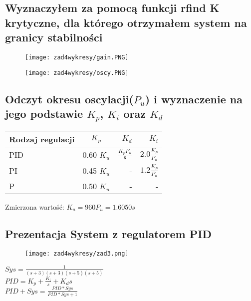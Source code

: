\subsection{Wyznaczyłem za pomocą funkcji rfind K krytyczne, dla którego otrzymałem system na granicy stabilności}

	\begin{figure}[H]
    \centering
    \texttt{[image: zad4wykresy/gain.PNG]}
    \label{lamana}
	\end{figure}

 \begin{figure}[H]
    \centering
    \texttt{[image: zad4wykresy/oscy.PNG]}
    \label{lamana}
	\end{figure}
	
\subsection{Odczyt okresu oscylacji($P_u$) i wyznaczenie na jego podstawie $K_p$, $K_i$ oraz $K_d$ }
	
 \begin{tabular}{|l|c|r|r|}
  \hline Rodzaj regulacji & $K_p$ & $K_d$ & $K_i$\\
  \hline PID & 0.60 $K_u$ & $\frac{K_pP_u}{8}$ & $2.0 \frac{K_p}{P_u}$\\
  \hline PI & 0.45 $K_u$ & - & $1.2 \frac{K_p}{P_u}$\\
  \hline P & 0.50 $K_u$ & - & -\\
  \hline
 \end{tabular}
 \vspace{0.5cm}
 \newline
 Zmierzona wartość:
 \vspace{0.5cm}
 \newline
 \vspace{0.5cm}
 \LARGE
	 $K_u = 960  P_u = 1.6050s$
 \normalsize

\subsection{Prezentacja System z regulatorem PID}

	\begin{figure}[H]
    \centering
    \texttt{[image: zad4wykresy/zad3.png]}
    \label{lamana}
	\end{figure}
	
	\LARGE
   $Sys=\frac{1}{(s+3)(s+3)(s+5)(s+5)}$ \\
   $PID=K_p+\frac{K_i}{s} + K_d s$	\\
   $PID+Sys=\frac{PID*Sys}{PID*Sys+1}$
  \normalsize
	
